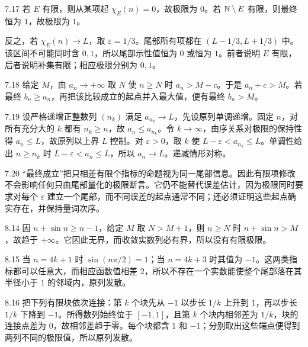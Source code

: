 \begin{solution}{7.17}
若 \(E\) 有限，则从某项起 \(\chi_E(n)=0\)，故极限为 \(0\)。若 \(\mathbb{N}\setminus E\) 有限，则最终恒为 \(1\)，故极限为 \(1\)。

反之，若 \(\chi_E(n)\to L\)，取 \(\varepsilon=1/3\)。尾部所有项都在
\((L-1/3,L+1/3)\) 中。该区间不可能同时含 \(0,1\)，所以尾部示性值恒为 \(0\) 或恒为 \(1\)。前者说明 \(E\) 有限，后者说明补集有限；相应极限分别为 \(0,1\)。
\end{solution}

\begin{solution}{7.18}
给定 \(M\)，由 \(a_n\to+\infty\) 取 \(N\) 使 \(n\ge N\) 时
\(a_n>M-c\)。于是 \(a_n+c>M\)。若最终 \(b_n\ge a_n\)，再把该比较成立的起点并入最大值，便有最终 \(b_n>M\)。
\end{solution}

\begin{solution}{7.19}
设严格递增正整数列 \((n_k)\) 满足 \(a_{n_k}\to L\)，先设原列单调递增。固定 \(n\)，对所有充分大的 \(k\) 都有 \(n_k\ge n\)，故 \(a_n\le a_{n_k}\)。令 \(k\to\infty\)，由序关系对极限的保持性得 \(a_n\le L\)，故原列以上界 \(L\) 控制。对 \(\varepsilon>0\)，取 \(k\) 使 \(L-\varepsilon<a_{n_k}\le L\)。单调性给出 \(n\ge n_k\) 时
\(L-\varepsilon<a_n\le L\)，所以 \(a_n\to L\)。递减情形对称。
\end{solution}

\begin{solution}{7.20}
“最终成立”把只相差有限个指标的命题视为同一尾部信息。因此有限项修改不会影响任何只由尾部量化的极限断言。它仍不能替代误差估计，因为极限同时要求对每个 \(\varepsilon\) 建立一个尾部，而不同误差的起点通常不同；还必须证明这些起点确实存在，并保持量词次序。
\end{solution}

\begin{solution}{8.14}
因 \(n+\sin n\ge n-1\)，给定 \(M\) 取 \(N>M+1\)，则 \(n\ge N\) 时
\(n+\sin n>M\)，故趋于 \(+\infty\)。它因此无界，而收敛实数列必有界，所以没有有限极限。
\end{solution}

\begin{solution}{8.15}
当 \(n=4k+1\) 时 \(\sin(n\pi/2)=1\)；当 \(n=4k+3\) 时其值为 \(-1\)。这两类指标都可以任意大，而相应函数值相差 \(2\)，所以不存在一个实数能使整个尾部落在其半径小于 \(1\) 的邻域内，原列发散。
\end{solution}

\begin{solution}{8.16}
把下列有限块依次连接：第 \(k\) 个块先从 \(-1\) 以步长 \(1/k\) 上升到 \(1\)，再以步长 \(1/k\) 下降到 \(-1\)。所得数列始终位于 \([-1,1]\)，且第 \(k\) 个块内相邻差为 \(1/k\)，块的连接点差为 \(0\)，故相邻差趋于零。每个块都含 \(1\) 和 \(-1\)；分别取出这些端点便得到两列不同的极限值，所以原列发散。
\end{solution}

